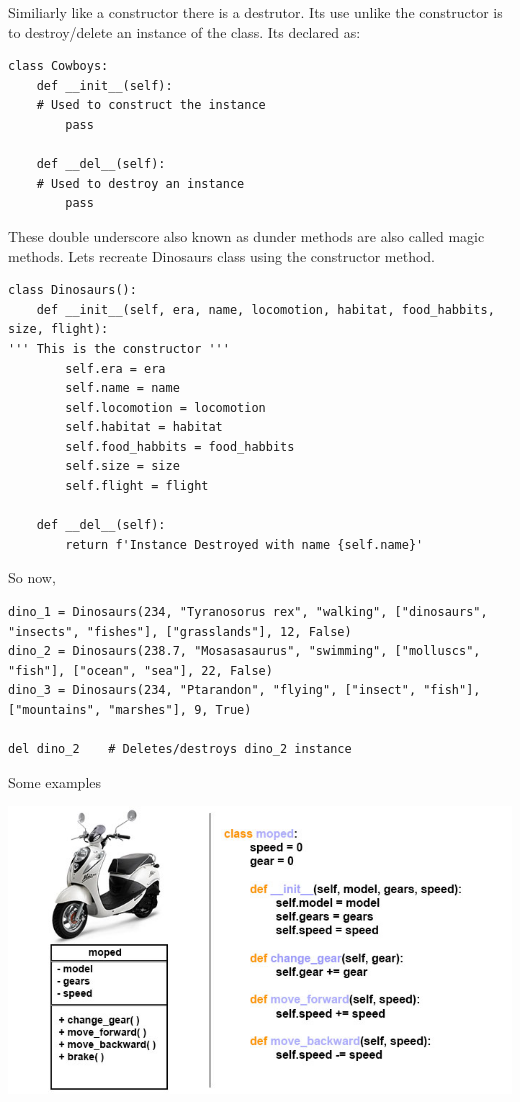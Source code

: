 \documentclass[11pt]{article}
\begin{document}
Similiarly like a constructor there is a destrutor. Its use unlike the constructor is to destroy/delete an instance of the class. Its declared as:
\begin{verbatim}
class Cowboys:
    def __init__(self):
    # Used to construct the instance
        pass

    def __del__(self):
    # Used to destroy an instance
        pass
\end{verbatim}

These double underscore also known as dunder methods are also called magic methods. Lets recreate Dinosaurs class using the constructor method.

\begin{verbatim}
class Dinosaurs():
    def __init__(self, era, name, locomotion, habitat, food_habbits, size, flight):
''' This is the constructor '''
        self.era = era
        self.name = name
        self.locomotion = locomotion
        self.habitat = habitat
        self.food_habbits = food_habbits
        self.size = size
        self.flight = flight

    def __del__(self):
        return f'Instance Destroyed with name {self.name}'
\end{verbatim}

So now,
\begin{verbatim}
dino_1 = Dinosaurs(234, "Tyranosorus rex", "walking", ["dinosaurs", "insects", "fishes"], ["grasslands"], 12, False)
dino_2 = Dinosaurs(238.7, "Mosasasaurus", "swimming", ["molluscs", "fish"], ["ocean", "sea"], 22, False)
dino_3 = Dinosaurs(234, "Ptarandon", "flying", ["insect", "fish"], ["mountains", "marshes"], 9, True)

del dino_2    # Deletes/destroys dino_2 instance
\end{verbatim}

Some examples
\begin{center}
\includegraphics[width=.9\linewidth]{./img/moped_class.jpg}
\end{center}
\end{document}
